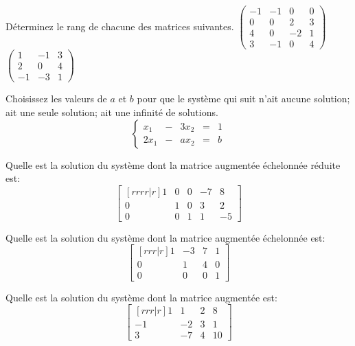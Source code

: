 \begin{TwoCol}
\begin{exercice}
	Déterminez le rang de chacune des matrices suivantes.
 $\displaystyle
	\begin{pmatrix}
	-1 & -1 & 0 & 0 \\
	0 & 0 & 2 & 3\\
	4 & 0 & -2 & 1 \\
	3 & -1 & 0 & 4
	\end{pmatrix}
	$
 $\displaystyle
	\begin{pmatrix}
	1 & -1 & 3\\
	2 & 0 & 4\\
	-1 & -3 & 1
	\end{pmatrix}
	$
\end{exercice}

\begin{exercice}
	Choisissez les valeurs de $a$ et $b$ pour que le système qui suit
 n'ait aucune solution;
 ait une seule solution;
 ait une infinité de solutions.
	\[
	\left\{
	\begin{matrix}
	x_1 &-& 3x_2 &=& 1 \\
	2x_1 &-& ax_2 &=& b
	\end{matrix}
	\right.
	\]
\end{exercice}

\begin{exercice}
	Quelle est la solution du système dont la matrice augmentée échelonnée réduite est:
	\[
	\begin{bmatrix}[rrrr|r]
	1 & 0 & 0 & -7 & 8 \\
	0 & 1 & 0 & 3 & 2 \\
	0 & 0 & 1 & 1 & -5
	\end{bmatrix}
	\]
\end{exercice}

\begin{exercice}
	Quelle est la solution du système dont la matrice augmentée échelonnée est:
	\[
	\begin{bmatrix}[rrr|r]
	1 & -3 & 7 & 1  \\
	0 & 1 & 4 & 0  \\
	0 & 0 & 0 & 1
	\end{bmatrix}
	\]
\end{exercice}

\begin{exercice}
	Quelle est la solution du système dont la matrice augmentée est:
	\[
	\begin{bmatrix}[rrr|r]
	1 & 1 & 2 & 8  \\
	-1 & -2 & 3 & 1  \\
	3 & -7 & 4 & 10
	\end{bmatrix}
	\]
\end{exercice}


\end{TwoCol}
